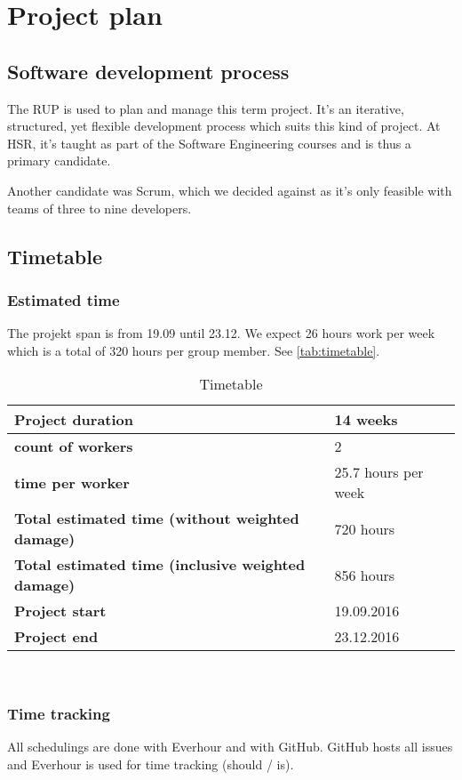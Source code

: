 \chapter{Project plan}
\section{Software development process}
The \gls{RUP} is used to plan and manage this term project. It’s an iterative,
structured, yet flexible development process which suits this kind of project.
At HSR, it’s taught as part of the Software Engineering courses and is thus a
primary candidate.

Another candidate was Scrum, which we decided against as it’s only feasible
with teams of three to nine developers.

\section{Timetable}
\subsection{Estimated time}
The projekt span is from 19.09 until 23.12. We expect 26 hours work per week which is a total of
320 hours per group member. See \autoref{tab:timetable}.

\begin{table}[H]
  \centering
  \scriptsize
  \begin{tabular}{|p{80mm}|p{15mm}|}
    \hline 	\bf Project duration & 14 weeks \\ \hline
	\bf count of workers & 2 \\ \hline
	\bf time per worker & 25.7 hours per week \\ \hline
	\bf Total estimated time (without weighted damage) & 720 hours \\ \hline
	\bf Total estimated time (inclusive weighted damage) & 856 hours \\ \hline
	\bf Project start & 19.09.2016 \\ \hline
	\bf Project end & 23.12.2016 \\ \hline
  \end{tabular} \\
  \caption{Timetable}
  \label{tab:timetable}
\end{table}

\subsection{Time tracking}
All schedulings are done with Everhour and with GitHub. GitHub hosts all issues
and Everhour is used for time tracking (should / is).

